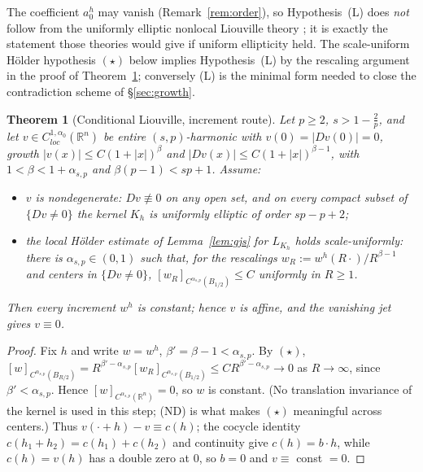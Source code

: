 \documentclass[11pt]{amsart}
\theoremstyle{plain}
\newtheorem{theorem}{Theorem}[section]
\theoremstyle{definition}
\theoremstyle{remark}
\newcommand{\R}{\mathbb{R}}
\newcommand{\al}{\alpha}
\newcommand{\asp}{\alpha_{s,p}}
\begin{document}
\noindent The coefficient $a_0^h$ may vanish (Remark~\ref{rem:order}), so
Hypothesis~(L) does \emph{not} follow from the uniformly elliptic nonlocal
Liouville theory \cite{FRO,Serra}; it is exactly the statement those theories
would give if uniform ellipticity held. The scale-uniform H\"older hypothesis
$(\star)$ below implies Hypothesis~(L) by the rescaling argument in the proof
of Theorem~\ref{thm:liouville-incr}; conversely (L) is the minimal form needed
to close the contradiction scheme of \S\ref{sec:growth}.

\begin{theorem}[Conditional Liouville, increment route]\label{thm:liouville-incr}
Let $p\ge2$, $s>1-\frac2p$, and let $v\in C^{1,\al_0}_{loc}(\R^n)$ be entire
$(s,p)$-harmonic with $v(0)=|Dv(0)|=0$, growth $|v(x)|\le C(1+|x|)^{\beta}$ and
$|Dv(x)|\le C(1+|x|)^{\beta-1}$, with $1<\beta<1+\asp$ and
$\beta(p-1)<sp+1$. Assume:
\begin{itemize}[leftmargin=2em]
\item[\textnormal{(ND)}] $v$ is \emph{nondegenerate}: $Dv\not\equiv0$ on any
open set, and on every compact subset of $\{Dv\neq0\}$ the kernel $K_h$ is
uniformly elliptic of order $sp-p+2$;
\item[$(\star)$] the local H\"older estimate of Lemma~\ref{lem:gjs} for
$L_{K_h}$ holds \emph{scale-uniformly}: there is $\asp\in(0,1)$ such that, for
the rescalings $w_R:=w^h(R\cdot)/R^{\beta-1}$ and centers in $\{Dv\neq0\}$,
$[w_R]_{C^{\asp}(B_{1/2})}\le C$ uniformly in $R\ge1$.
\end{itemize}
Then every increment $w^h$ is constant; hence $v$ is affine, and the vanishing
jet gives $v\equiv0$.
\end{theorem}
\begin{proof}
Fix $h$ and write $w=w^h$, $\beta'=\beta-1<\asp$. By $(\star)$,
$[w]_{C^{\asp}(B_{R/2})}=R^{\beta'-\asp}[w_R]_{C^{\asp}(B_{1/2})}\le
CR^{\beta'-\asp}\to0$ as $R\to\infty$, since $\beta'<\asp$. Hence
$[w]_{C^{\asp}(\R^n)}=0$, so $w$ is constant. (No translation invariance of the
kernel is used in this step; (ND) is what makes $(\star)$ meaningful across
centers.) Thus $v(\cdot+h)-v\equiv c(h)$; the cocycle identity
$c(h_1+h_2)=c(h_1)+c(h_2)$ and continuity give $c(h)=b\cdot h$, while
$c(h)=v(h)$ has a double zero at $0$, so $b=0$ and $v\equiv$ const $=0$.
\end{proof}
\end{document}
